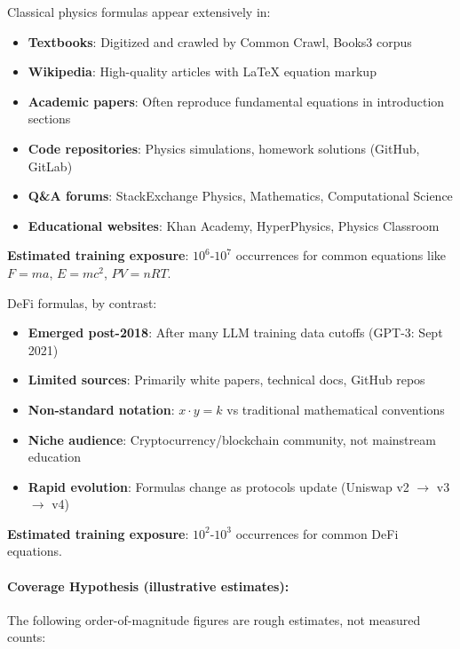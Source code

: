 \documentclass[twoside,11pt]{article}
\begin{document}
Classical physics formulas appear extensively in:
\begin{itemize}
\item \textbf{Textbooks}: Digitized and crawled by Common Crawl, Books3 corpus
\item \textbf{Wikipedia}: High-quality articles with LaTeX equation markup
\item \textbf{Academic papers}: Often reproduce fundamental equations in introduction sections
\item \textbf{Code repositories}: Physics simulations, homework solutions (GitHub, GitLab)
\item \textbf{Q\&A forums}: StackExchange Physics, Mathematics, Computational Science
\item \textbf{Educational websites}: Khan Academy, HyperPhysics, Physics Classroom
\end{itemize}

\textbf{Estimated training exposure}: $10^6$-$10^7$ occurrences for common equations like $F = ma$, $E = mc^2$, $PV = nRT$.

DeFi formulas, by contrast:
\begin{itemize}
\item \textbf{Emerged post-2018}: After many LLM training data cutoffs (GPT-3: Sept 2021)\citep{kambhampati2024llms}
\item \textbf{Limited sources}: Primarily white papers, technical docs, GitHub repos
\item \textbf{Non-standard notation}: $x \cdot y = k$ vs traditional mathematical conventions
\item \textbf{Niche audience}: Cryptocurrency/blockchain community, not mainstream education
\item \textbf{Rapid evolution}: Formulas change as protocols update (Uniswap v2 $\to$ v3 $\to$ v4)
\end{itemize}

\textbf{Estimated training exposure}: $10^2$-$10^3$ occurrences for common DeFi equations.

\paragraph{Coverage Hypothesis (illustrative estimates):}

The following order-of-magnitude figures are rough estimates, not measured counts:
\end{document}
